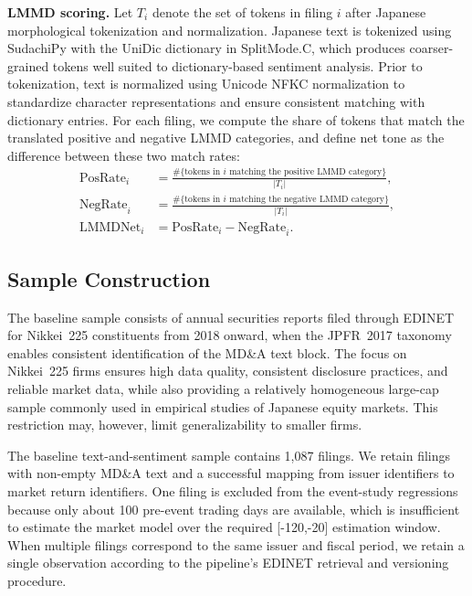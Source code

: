 \noindent\textbf{LMMD scoring.}
Let $T_i$ denote the set of tokens in filing $i$ after Japanese morphological tokenization and normalization. Japanese text is tokenized using SudachiPy with the UniDic dictionary in SplitMode.C, which produces coarser-grained tokens well suited to dictionary-based sentiment analysis. Prior to tokenization, text is normalized using Unicode NFKC normalization to standardize character representations and ensure consistent matching with dictionary entries. For each filing, we compute the share of tokens that match the translated positive and negative LMMD categories, and define net tone as the difference between these two match rates:
\begin{align}
\text{PosRate}_i &= \frac{\#\{\text{tokens in } i \text{ matching the positive LMMD category}\}}{|T_i|}, \\
\text{NegRate}_i &= \frac{\#\{\text{tokens in } i \text{ matching the negative LMMD category}\}}{|T_i|}, \\
\text{LMMDNet}_i &= \text{PosRate}_i - \text{NegRate}_i .
\end{align}

\subsection{Sample Construction}

The baseline sample consists of annual securities reports filed through EDINET for Nikkei~225 constituents from 2018 onward, when the JPFR~2017 taxonomy enables consistent identification of the MD\&A text block. The focus on Nikkei~225 firms ensures high data quality, consistent disclosure practices, and reliable market data, while also providing a relatively homogeneous large-cap sample commonly used in empirical studies of Japanese equity markets. This restriction may, however, limit generalizability to smaller firms.

The baseline text-and-sentiment sample contains 1,087 filings. We retain filings with non-empty MD\&A text and a successful mapping from issuer identifiers to market return identifiers. One filing is excluded from the event-study regressions because only about 100 pre-event trading days are available, which is insufficient to estimate the market model over the required [-120,-20] estimation window. When multiple filings correspond to the same issuer and fiscal period, we retain a single observation according to the pipeline’s EDINET retrieval and versioning procedure.
